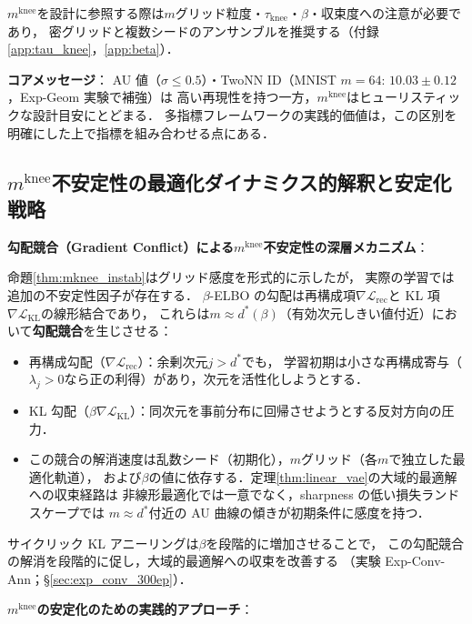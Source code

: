 \documentclass[11pt,a4paper]{jsarticle}
\newcommand{\mknee}{m^{\mathrm{knee}}}
\begin{document}
$\mknee$を設計に参照する際は$m$グリッド粒度・$\tau_\mathrm{knee}$・$\beta$・収束度への注意が必要であり，
密グリッドと複数シードのアンサンブルを推奨する（付録\ref{app:tau_knee}，\ref{app:beta}）．

\textbf{コアメッセージ}：
AU 値（$\sigma \leq 0.5$）・TwoNN ID（MNIST $m=64$: $10.03 \pm 0.12$，Exp-Geom 実験で補強）は
高い再現性を持つ一方，$\mknee$はヒューリスティックな設計目安にとどまる．
多指標フレームワークの実践的価値は，この区別を明確にした上で指標を組み合わせる点にある．

\subsection{$\mknee$不安定性の最適化ダイナミクス的解釈と安定化戦略}\label{sec:disc_mknee_improve}

\textbf{勾配競合（Gradient Conflict）による$\mknee$不安定性の深層メカニズム}：

命題\ref{thm:mknee_instab}はグリッド感度を形式的に示したが，
実際の学習では追加の不安定性因子が存在する．
$\beta$-ELBO の勾配は再構成項$\nabla\mathcal{L}_\mathrm{rec}$と
KL 項$\nabla\mathcal{L}_\mathrm{KL}$の線形結合であり，
これらは$m \approx d^*(\beta)$（有効次元しきい値付近）において\textbf{勾配競合}を生じさせる：

\begin{itemize}
  \item 再構成勾配（$\nabla\mathcal{L}_\mathrm{rec}$）：余剰次元$j > d^*$でも，
        学習初期は小さな再構成寄与（$\lambda_j > 0$なら正の利得）があり，次元を活性化しようとする．
  \item KL 勾配（$\beta\nabla\mathcal{L}_\mathrm{KL}$）：同次元を事前分布に回帰させようとする反対方向の圧力．
  \item この競合の解消速度は乱数シード（初期化），$m$グリッド（各$m$で独立した最適化軌道），
        および$\beta$の値に依存する．定理\ref{thm:linear_vae}の大域的最適解への収束経路は
        非線形最適化では一意でなく，sharpness の低い損失ランドスケープでは
        $m \approx d^*$付近の AU 曲線の傾きが初期条件に感度を持つ．
\end{itemize}

サイクリック KL アニーリング\cite{fu2019cyclical}は$\beta$を段階的に増加させることで，
この勾配競合の解消を段階的に促し，大域的最適解への収束を改善する
（実験 Exp-Conv-Ann；§\ref{sec:exp_conv_300ep}）．

\textbf{$\mknee$の安定化のための実践的アプローチ}：
\end{document}

